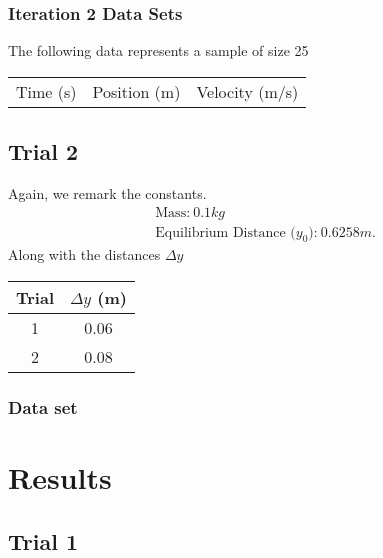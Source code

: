 \documentclass{report}
\begin{document}
    \bigbreak \noindent 
    \subsubsection{Iteration 2 Data Sets}
    \bigbreak \noindent 
    The following data represents a sample of size 25
    \bigbreak \noindent 
    \begin{center}
        \begin{tabular}{c|c|c}
            Time (s) & Position (m) & Velocity (m/s)
            \hline
        \end{tabular}
    \end{center}


    \bigbreak \noindent 
    \subsection{Trial 2}
    \bigbreak \noindent 
    Again, we remark the constants. 
    \begin{align*}
         &\text{Mass:}\ 0.1kg\\
         &\text{Equilibrium Distance ($y_{0}$):}\ 0.6258m
     .\end{align*}
     \bigbreak \noindent 
     Along with the distances $\Delta y$
     \begin{center}
         \begin{tabular}{c|c}
             Trial & $\Delta y$ (m) \\
             \hline
             1 & 0.06 \\
             2 & 0.08
         \end{tabular}
     \end{center}
     \tc{}

     \bigbreak \noindent 
     \subsubsection{Data set}






     \bigbreak \noindent 
     \section{Results}
     \bigbreak \noindent 

     \bigbreak \noindent 
     \subsection{Trial 1}
     \bigbreak \noindent 
\end{document}
